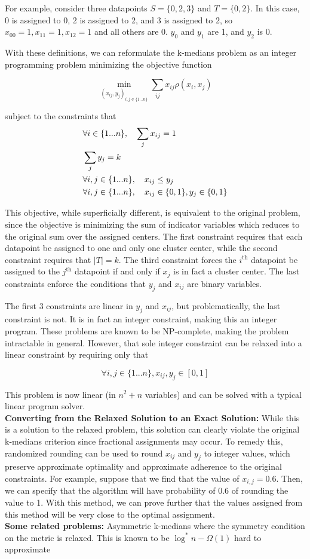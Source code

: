 \begin{example}
	For example, consider three datapoints $S=\{0, 2, 3\}$ and
	$T=\{0, 2\}$. In this case, 0 is assigned to 0, 2 is assigned to 2, and 3 is assigned to 2,
	so $x_{00} = 1, x_{11}=1, x_{12}=1$ and all others are 0. $y_0$ and $y_1$ are 1, and $y_2$ is 0.
\end{example}

With these definitions, we can reformulate the k-medians problem as 
an integer programming problem minimizing the objective function

$$\min_{(x_{ij}, y_j)_{i, j \in \{1...n\}}} \sum_{ij} x_{ij}\rho(x_i, x_j)$$

subject to the constraints that
\begin{align}
	& \forall i \in \{1...n\}, \quad\sum_j x_{ij} = 1 \notag \\
	& \sum_j y_j = k \notag \\ 
	& \forall i, j \in \{1...n\},  \quad x_{ij} \leq y_j \notag \\
	& \forall i, j \in \{1...n\},  \quad x_{ij}\in \{0, 1\}, y_j\in\{0, 1\} \notag
\end{align}

This objective, while superficially different, is equivalent to the original problem, 
since the objective is minimizing the sum of indicator variables which reduces
to the original sum over the assigned centers. The first constraint requires that 
each datapoint be assigned to one and only one cluster center, while the second 
constraint requires that $|T|=k$. The third constraint forces the $i^\text{th}$ 
datapoint be assigned to the $j^\text{th}$ datapoint if and only if $x_j$ is in fact
a cluster center. The last constraints enforce the conditions that $y_j$ and $x_{ij}$
are binary variables. 

The first 3 constraints are linear in $y_j$ and $x_{ij}$, but problematically, the last constraint is not. 
It is in fact an integer constraint, making this an integer program. These problems are known to be NP-complete, making the problem intractable in general. However, that sole integer
constraint can be relaxed into a linear constraint by requiring only that

$$\forall i, j \in \{1...n\}, x_{ij}, y_j \in[0, 1]$$

This problem is now linear (in $n^2 + n$ variables) and can be solved with a typical linear program solver.\\

\noindent\textbf{Converting from the Relaxed Solution to an Exact Solution:} While this is a solution to the relaxed problem, this solution can clearly violate the original k-medians criterion 
since fractional assignments may occur. To remedy this, randomized rounding can be used to round $x_{ij}$ and $y_j$ to
integer values, which preserve approximate optimality and approximate adherence to the
original constraints. For example, suppose that we find that the value of $x_{i,j} = 0.6.$ Then, we can specify that the algorithm will have probability of 0.6 of rounding the value to 1. With this method, we can prove further that the values assigned from this method will be very close to the optimal assignment.\\

\noindent\textbf{Some related problems:} Asymmetric k-medians where the symmetry condition
on the metric is relaxed. This is known to be $\log^*n - \Omega(1)$ hard to approximate
